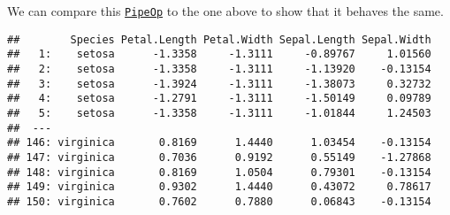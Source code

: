 \documentclass[
]{scrbook}
\newenvironment{Shaded}{\begin{snugshade}}{\end{snugshade}}
\newcommand{\DecValTok}[1]{\textcolor[rgb]{0.00,0.00,0.81}{#1}}
\newcommand{\FunctionTok}[1]{\textcolor[rgb]{0.00,0.00,0.00}{#1}}
\newcommand{\NormalTok}[1]{#1}
\newcommand{\OtherTok}[1]{\textcolor[rgb]{0.56,0.35,0.01}{#1}}
\newcommand{\SpecialCharTok}[1]{\textcolor[rgb]{0.00,0.00,0.00}{#1}}
\renewenvironment{Shaded} {\begin{snugshade}\small} {\end{snugshade}}
\begin{document}
We can compare this \href{https://mlr3pipelines.mlr-org.com/reference/PipeOp.html}{\texttt{PipeOp}} to the one above to show that it behaves the same.

\begin{Shaded}
\end{Shaded}

\begin{Shaded}
\end{Shaded}

\begin{verbatim}
##        Species Petal.Length Petal.Width Sepal.Length Sepal.Width
##   1:    setosa      -1.3358     -1.3111     -0.89767     1.01560
##   2:    setosa      -1.3358     -1.3111     -1.13920    -0.13154
##   3:    setosa      -1.3924     -1.3111     -1.38073     0.32732
##   4:    setosa      -1.2791     -1.3111     -1.50149     0.09789
##   5:    setosa      -1.3358     -1.3111     -1.01844     1.24503
##  ---                                                            
## 146: virginica       0.8169      1.4440      1.03454    -0.13154
## 147: virginica       0.7036      0.9192      0.55149    -1.27868
## 148: virginica       0.8169      1.0504      0.79301    -0.13154
## 149: virginica       0.9302      1.4440      0.43072     0.78617
## 150: virginica       0.7602      0.7880      0.06843    -0.13154
\end{verbatim}

\begin{Shaded}
\end{Shaded}
\end{document}
